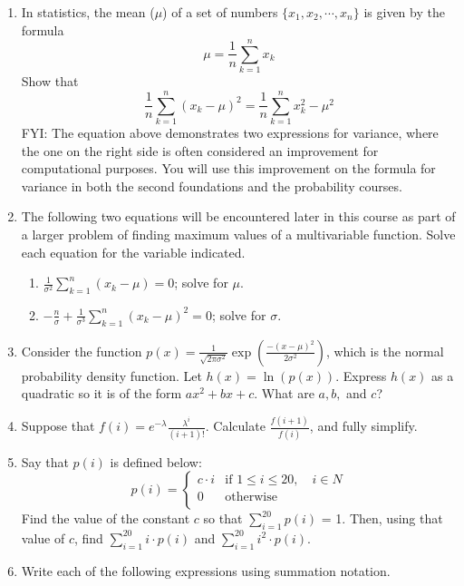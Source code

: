 \documentclass{article}
\begin{document}
\begin{enumerate}
                    \item In statistics, the mean ($\mu$) of a set of numbers $\{x_1, x_2, \cdots, x_n\}$ is given by the formula $$\mu = \frac{1}{n}\sum_{k=1}^n x_k$$  Show that $$\frac{1}{n}\sum_{k=1}^n (x_k-\mu)^2 = \frac{1}{n}\sum_{k=1}^n x_k^2-\mu^2$$  FYI: The equation above demonstrates two expressions for variance, where the one on the right side is often considered an improvement for computational purposes.  You will use this improvement on the formula for variance in both the second foundations and the probability courses.
                    \item The following two equations will be encountered later in this course as part of a larger problem of finding maximum values of a multivariable function.  Solve each equation for the variable indicated. 
                       \begin{enumerate}
                           \item $ \frac{1}{\sigma^2}\sum_{k=1}^{n}(x_k-\mu)=0$; solve for $\mu$.
                           \item $ -\frac{n}{\sigma}+\frac{1}{\sigma^3}\sum_{k=1}^{n}(x_k-\mu)^2=0$; solve for $\sigma$.
                       \end{enumerate} 
                    \item Consider the function $ p(x) = \frac{1}{\sqrt{2\pi \sigma^2}}\exp\left( \frac{-(x-\mu)^2}{2\sigma^2}\right)$, which is the normal probability density function.  Let $h(x) = \ln(p(x))$.  Express $h(x)$ as a quadratic so it is of the form $ax^2+bx+c$. What are $a,b,$ and $c$? 
                    \item Suppose that $ f(i)= e^{-\lambda}\frac{\lambda^i}{(i+1)!}$.  Calculate $ \frac{f(i+1)}{f(i)}$, and fully simplify.
                    \item Say that $p(i)$ is defined below:
                        $$ p(i) = \begin{cases} 
                        c\cdot i & \text{if $1 
                        \leq i \leq 20, \quad i \in N$} \\
                        0 & \text{otherwise} \\
                        \end{cases}
                        $$
                        Find the value of the constant $c$ so that $ \sum_{i=1}^{20} p(i)$ = 1. Then, using that value of $c$, find $ \sum_{i=1}^{20} i\cdot p(i)$ and $ \sum_{i=1}^{20} i^2 \cdot p(i)$. 
                    \item Write each of the following expressions using summation notation.

\end{enumerate}
\end{document}
